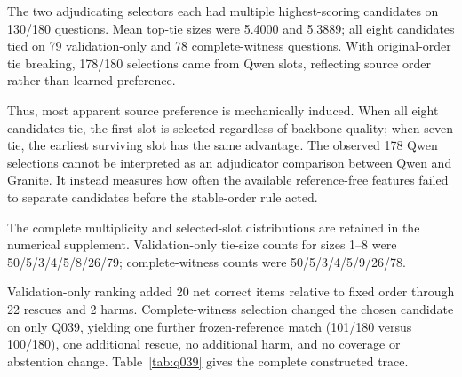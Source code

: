 \documentclass[applsci,article,submit,moreauthors]{Definitions/mdpi}
\begin{document}
The two adjudicating selectors each had multiple highest-scoring candidates on 130/180 questions. Mean top-tie sizes were 5.4000 and 5.3889; all eight candidates tied on 79 validation-only and 78 complete-witness questions. With original-order tie breaking, 178/180 selections came from Qwen slots, reflecting source order rather than learned preference.

Thus, most apparent source preference is mechanically induced. When all eight candidates tie, the first slot is selected regardless of backbone quality; when seven tie, the earliest surviving slot has the same advantage. The observed 178 Qwen selections cannot be interpreted as an adjudicator comparison between Qwen and Granite. It instead measures how often the available reference-free features failed to separate candidates before the stable-order rule acted.

The complete multiplicity and selected-slot distributions are retained in the numerical supplement. Validation-only tie-size counts for sizes 1--8 were 50/5/3/4/5/8/26/79; complete-witness counts were 50/5/3/4/5/9/26/78.

Validation-only ranking added 20 net correct items relative to fixed order through 22 rescues and 2 harms. Complete-witness selection changed the chosen candidate on only Q039, yielding one further frozen-reference match (101/180 versus 100/180), one additional rescue, no additional harm, and no coverage or abstention change. Table~\ref{tab:q039} gives the complete constructed trace.

\begin{table}[htbp]
\caption{Q039 is the sole validation-only versus complete-witness selection difference. Correctness is agreement with the frozen synthetic reference, not an independently adjudicated engineering judgment.}
\label{tab:q039}
\centering
\footnotesize
{}
\end{table}
\end{document}

